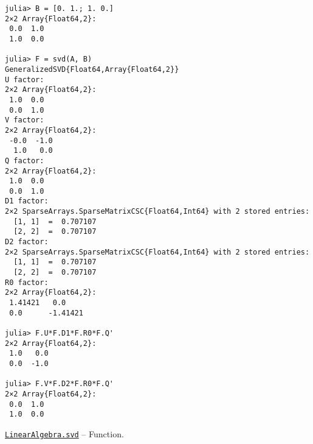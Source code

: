 \begin{adjustwidth}{2em}{0pt}
\begin{verbatim}
julia> B = [0. 1.; 1. 0.]
2×2 Array{Float64,2}:
 0.0  1.0
 1.0  0.0

julia> F = svd(A, B)
GeneralizedSVD{Float64,Array{Float64,2}}
U factor:
2×2 Array{Float64,2}:
 1.0  0.0
 0.0  1.0
V factor:
2×2 Array{Float64,2}:
 -0.0  -1.0
  1.0   0.0
Q factor:
2×2 Array{Float64,2}:
 1.0  0.0
 0.0  1.0
D1 factor:
2×2 SparseArrays.SparseMatrixCSC{Float64,Int64} with 2 stored entries:
  [1, 1]  =  0.707107
  [2, 2]  =  0.707107
D2 factor:
2×2 SparseArrays.SparseMatrixCSC{Float64,Int64} with 2 stored entries:
  [1, 1]  =  0.707107
  [2, 2]  =  0.707107
R0 factor:
2×2 Array{Float64,2}:
 1.41421   0.0
 0.0      -1.41421

julia> F.U*F.D1*F.R0*F.Q'
2×2 Array{Float64,2}:
 1.0   0.0
 0.0  -1.0

julia> F.V*F.D2*F.R0*F.Q'
2×2 Array{Float64,2}:
 0.0  1.0
 1.0  0.0
\end{verbatim}



\end{adjustwidth}
\hypertarget{6661056220970412040}{} 
\hyperlink{6661056220970412040}{\texttt{LinearAlgebra.svd}}  -- {Function.}

